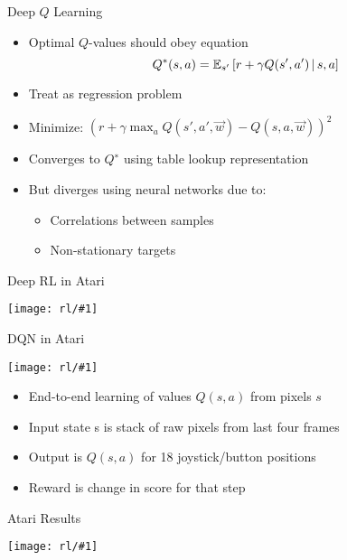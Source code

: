 \documentclass[compress]{beamer}
\newcommand{\gfx}[2]{
\begin{center}
	\texttt{[image: rl/\#1]}
\end{center}
}
\begin{document}
\begin{frame}{Deep $Q$ Learning}

\begin{itemize}
\item Optimal $Q$-values should obey equation
\begin{equation}
Q^*(s, a) = \mathbb{E}_{s'}\left[ r + \gamma Q(s', a') \, | \, s, a \right]
\end{equation}
\item Treat as regression problem
\item Minimize: $\left(r + \gamma \max_a Q(s', a', \vec w) - Q(s, a,
    \vec w) \right)^2$
\item Converges to $Q^∗$ using table lookup representation
\item But diverges using neural networks due to:
\begin{itemize}
\item Correlations between samples
\item Non-stationary targets
\end{itemize}
\end{itemize}
\end{frame}

\begin{frame}{Deep RL in Atari}

  \gfx{atari}{.9}

\end{frame}

\begin{frame}{DQN in Atari}

\gfx{atari_net}{.8}
\begin{itemize}
\item End-to-end learning of values $Q(s, a)$ from pixels $s$
\item Input state s is stack of raw pixels from last four frames
\item Output is $Q(s, a)$ for 18 joystick/button positions
\item Reward is change in score for that step
\end{itemize}

\end{frame}


\begin{frame}{Atari Results}
  \gfx{atari_results}{.9}
\end{frame}
\end{document}
